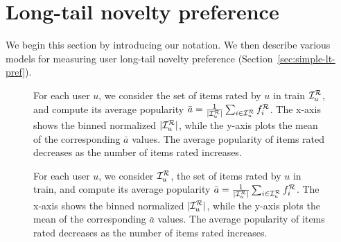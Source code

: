 \section{Long-tail novelty preference}
\label{sec:lt-pref}
We begin this section by  introducing our notation. We then describe various models  for measuring user long-tail novelty preference (Section~\ref{sec:simple-lt-pref}).%
\iffullpaper
\begin{figure*}[t]
\centering
 		        
\caption{For each user $u$, we consider the set of items rated by $u$ in train $\mathcal{I}_{u}^{\mathcal{R}}$, and compute its average popularity $ \bar{a} =\frac{1 }{|\mathcal{I}_{u}^{\mathcal{R}}|} \sum_{i \in \mathcal{I}_{u}^{\mathcal{R}}} f_i^{\mathcal{R}}$. The x-axis shows the binned normalized $|\mathcal{I}_{u}^{\mathcal{R}}|$, while the y-axis plots the mean of the corresponding $\bar{a}$ values. The average popularity of items rated decreases as the number of items rated increases. }
\label{fig:pop-vs-no-items}
\end{figure*}

\else %
\begin{figure}[t]
\centering
\caption{For each user $u$, we consider  $\mathcal{I}_{u}^{\mathcal{R}}$, the set of items rated by $u$ in train, and compute its average popularity $ \bar{a} =\frac{1 }{|\mathcal{I}_{u}^{\mathcal{R}}|} \sum_{i \in \mathcal{I}_{u}^{\mathcal{R}}} f_i^{\mathcal{R}}$. The x-axis shows the binned normalized $|\mathcal{I}_{u}^{\mathcal{R}}|$, while the y-axis plots the mean of the corresponding $\bar{a}$ values. The average popularity of items rated decreases as the number of items rated increases. }
\label{fig:pop-vs-no-items}
\end{figure}
\fi


